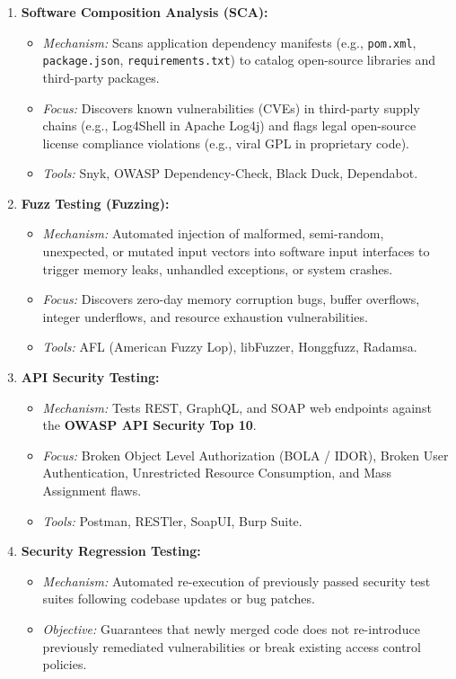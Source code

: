 \begin{enumerate}
\item \textbf{Software Composition Analysis (SCA):}
\begin{itemize}
\item \textit{Mechanism:} Scans application dependency manifests (e.g., \texttt{pom.xml}, \texttt{package.json}, \texttt{requirements.txt}) to catalog open-source libraries and third-party packages.
\item \textit{Focus:} Discovers known vulnerabilities (CVEs) in third-party supply chains (e.g., Log4Shell in Apache Log4j) and flags legal open-source license compliance violations (e.g., viral GPL in proprietary code).
\item \textit{Tools:} Snyk, OWASP Dependency-Check, Black Duck, Dependabot.
\end{itemize}

\item \textbf{Fuzz Testing (Fuzzing):}
\begin{itemize}
\item \textit{Mechanism:} Automated injection of malformed, semi-random, unexpected, or mutated input vectors into software input interfaces to trigger memory leaks, unhandled exceptions, or system crashes.
\item \textit{Focus:} Discovers zero-day memory corruption bugs, buffer overflows, integer underflows, and resource exhaustion vulnerabilities.
\item \textit{Tools:} AFL (American Fuzzy Lop), libFuzzer, Honggfuzz, Radamsa.
\end{itemize}

\item \textbf{API Security Testing:}
\begin{itemize}
\item \textit{Mechanism:} Tests REST, GraphQL, and SOAP web endpoints against the \textbf{OWASP API Security Top 10}.
\item \textit{Focus:} Broken Object Level Authorization (BOLA / IDOR), Broken User Authentication, Unrestricted Resource Consumption, and Mass Assignment flaws.
\item \textit{Tools:} Postman, RESTler, SoapUI, Burp Suite.
\end{itemize}

\item \textbf{Security Regression Testing:}
\begin{itemize}
\item \textit{Mechanism:} Automated re-execution of previously passed security test suites following codebase updates or bug patches.
\item \textit{Objective:} Guarantees that newly merged code does not re-introduce previously remediated vulnerabilities or break existing access control policies.
\end{itemize}
\end{enumerate}

